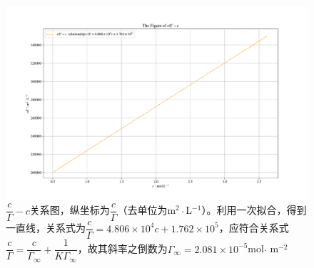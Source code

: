 \documentclass[UTF8,AutoFakeBold,a4paper]{article}
\begin{document}
\begin{figure}[h]
	\centering
	\includegraphics[scale=0.4]{Figure3}
	\caption{$\dfrac{c}{\varGamma}-c$关系图，纵坐标为$\dfrac{c}{\varGamma}$（去单位为m$^{2}\cdot$L$^{-1}$）。利用一次拟合，得到一直线，关系式为\textcolor[rgb]{0.54,0.13,0.33}{$\dfrac{c}{\varGamma} = 4.806 \times 10^{4}c + 1.762 \times 10^{5}$}，应符合关系式\textcolor[rgb]{0.07,0.36,0.57}{$\dfrac{c}{\varGamma} = \dfrac{c}{\varGamma_{\infty}}+\dfrac{1}{K\varGamma_{\infty}}$}，故其斜率之倒数为$\varGamma_{\infty} = 2.081 \times10^{-5}$mol$\cdot$ m$^{-2}$}
	\label{fi4}
\end{figure}
\end{document}
